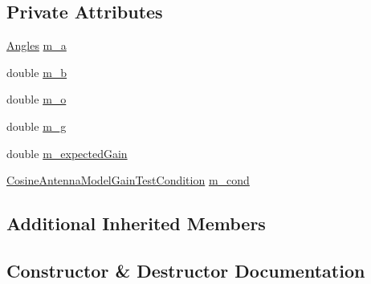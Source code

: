 \subsection*{Private Attributes}
\begin{DoxyCompactItemize}
\item 
\hyperlink{structns3_1_1Angles}{Angles} \hyperlink{classCosineAntennaModelTestCase_ad7515779cdfb757e559c9496eb5f4776}{m\+\_\+a}
\item 
double \hyperlink{classCosineAntennaModelTestCase_a755bba9ca3173119e46f1833cdcff5c7}{m\+\_\+b}
\item 
double \hyperlink{classCosineAntennaModelTestCase_a98565b122b2d2b97efd4021119bf60af}{m\+\_\+o}
\item 
double \hyperlink{classCosineAntennaModelTestCase_ad86c712d0fe6a2359cedd24bfdcce8cf}{m\+\_\+g}
\item 
double \hyperlink{classCosineAntennaModelTestCase_a1d2e6d618ec6ebb14fe322827ca37457}{m\+\_\+expected\+Gain}
\item 
\hyperlink{test-cosine-antenna_8cc_ae8bcd1a3938ab2748667be8c74661c05}{Cosine\+Antenna\+Model\+Gain\+Test\+Condition} \hyperlink{classCosineAntennaModelTestCase_abc25717936ad642fb4b9000020ed4cec}{m\+\_\+cond}
\end{DoxyCompactItemize}
\subsection*{Additional Inherited Members}


\subsection{Constructor \& Destructor Documentation}
